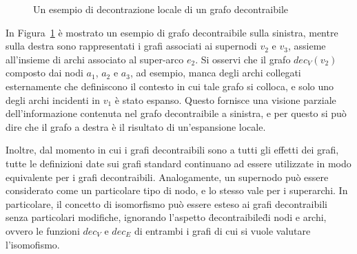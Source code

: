     \begin{figure}[h!]
      \centering
      
      \caption{Un esempio di decontrazione locale di un grafo decontraibile}
      \label{fig:dec-graph-example}
    \end{figure}

    In Figura~\ref{fig:dec-graph-example} \`e mostrato un esempio di grafo decontraibile sulla sinistra, mentre sulla
    destra sono rappresentati i grafi associati ai supernodi $v_2$ e $v_3$, assieme all'insieme di archi associato
    al super-arco $e_2$.
    Si osservi che il grafo $dec_V(v_2)$ composto dai nodi $a_1$, $a_2$ e $a_3$, ad esempio, manca degli archi collegati
    esternamente che definiscono il contesto in cui tale grafo si colloca, e solo uno degli archi incidenti
    in $v_1$ \`e stato espanso.
    Questo fornisce una visione parziale dell'informazione contenuta nel grafo decontraibile a sinistra,
    e per questo si pu\`o dire che il grafo a destra \`e il risultato di un'espansione locale. \newline

    Inoltre, dal momento in cui i grafi decontraibili sono a tutti gli effetti dei grafi, tutte le
    definizioni date sui grafi standard continuano ad essere utilizzate in modo equivalente per i grafi decontraibili.
    Analogamente, un supernodo pu\`o essere considerato come un particolare tipo di nodo, e lo stesso vale per i
    superarchi.
    In particolare, il concetto di isomorfismo pu\`o essere esteso ai grafi decontraibili senza particolari modifiche,
    ignorando l'aspetto \"decontraibile\" di nodi e archi, ovvero le funzioni $dec_V$ e $dec_E$ di entrambi i grafi
    di cui si vuole valutare l'isomofismo.



